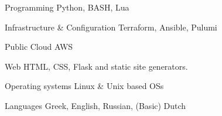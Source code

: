 


\begin{cvskills}


\cvskill
{Programming} %
{Python, BASH, Lua} %


\cvskill
{Infrastructure \& Configuration} %
{Terraform, Ansible, Pulumi} %


\cvskill
{Public Cloud} %
{AWS} %


\cvskill
{Web} %
{HTML, CSS, Flask and static site generators.} %


\cvskill
{Operating systems} %
{Linux & Unix based OSs} %




\cvskill
{Languages} %
{Greek, English, Russian, (Basic) Dutch} %

\end{cvskills}

